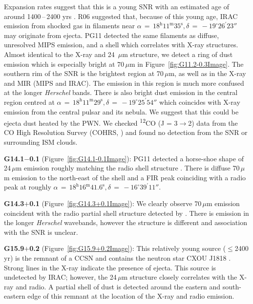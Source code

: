 \documentclass[fleqn,usenatbib]{mnras}
\begin{document}
{Expansion rates suggest that this is a young SNR with an estimated age of around 1400\,--\,2400 yrs \citep{Tam2003, Borkowski2016}. R06 suggested that, because of this young age, IRAC emission from shocked gas in filaments near $\alpha\,=\,18^\text{h}11^\text{m}35^\text{s}, \delta\,=\,-19^\circ26^\prime23''$ may originate from ejecta.
PG11 detected the same filaments as diffuse, unresolved MIPS emission, and a shell which correlates with X-ray structures. Almost identical to the X-ray and 24~$\mu$m structure, we detect a ring of dust emission which is especially bright at 70\,$\mu$m in Figure~\ref{fig:G11.2-0.3Image}. The southern rim of the SNR is the brightest region at 70\,$\mu$m, as well as in the X-ray and MIR (MIPS and IRAC). The emission in this region is much more confused at the longer \textit{Herschel} bands. There is also bright dust emission in the central region centred at $\alpha\,=\,18^\text{h}11^\text{m}29^\text{s}, \delta\,=\,-19^\circ25^\prime54''$ which coincides with X-ray emission from the central pulsar and its nebula. We suggest that this could be ejecta dust heated by the PWN. We checked \textsuperscript{12}CO (J = 3$\rightarrow$2) data from the CO High Resolution Survey (COHRS, \cite{Dempsey2013}) and found no detection from the SNR or surrounding ISM clouds.
\bigskip

\textbf{G14.1$-$0.1} (Figure~\ref{fig:G14.1-0.1Image}): PG11 detected a horse-shoe shape of 24\,$\mu$m emission roughly matching the radio shell structure \citep{Brogan2004}. There is diffuse 70\,$\mu$m emission to the north-east of the shell and a FIR peak coinciding with a radio peak at roughly $\alpha\,=\,18^\text{h}16^\text{m}41.6^\text{s}, \delta\,=\,-16^\circ39^\prime11''$.
\bigskip

\textbf{G14.3$+$0.1} (Figure~\ref{fig:G14.3+0.1Image}): We clearly observe 70\,$\mu$m emission coincident with the radio partial shell structure detected by \citet{Brogan2006}. There is emission in the longer \textit{Herschel} wavebands, however the structure is different and association with the SNR is unclear.
\bigskip

\textbf{G15.9$+$0.2} (Figure~\ref{fig:G15.9+0.2Image}): This relatively young source ($\leqslant$2400\,yr) is the remnant of a CCSN and contains the neutron star CXOU J1818 \citep{Reynolds2006, Klochkov2016}. Strong lines in the X-ray indicate the presence of ejecta. This source is undetected by IRAC; however, the 24\,$\mu$m structure closely correlates with the X-ray and radio. A partial shell of dust is detected around the eastern and south-eastern edge of this remnant at the location of the X-ray and radio emission.
\bigskip

}
\end{document}
